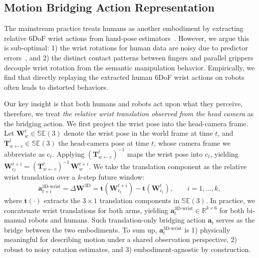\subsection{Motion Bridging Action Representation}
\label{sec:method:action_repr}


% 
The mainstream practice treats humans as another embodiment by extracting relative 6DoF wrist actions from hand-pose estimators~\cite{kareer2025egomimic,kareer2025emergence,cheang2025gr3,yuan2025motiontrans,zheng2026egoscale}.
% 
However, we argue this is sub-optimal: 1) the wrist rotations for human data are noisy due to predictor errors~\cite{wei2026one}, and 2) the distinct contact patterns between fingers and parallel grippers decouple wrist rotation from the semantic manipulation behavior. 
% 
Empirically, we find that directly replaying the extracted human 6DoF wrist actions on robots often leads to distorted behaviors.


%
Our key insight is that both humans and robots act upon what they perceive, therefore, we treat \emph{the relative wrist translation observed from the head camera} as the bridging action.
% 
We first project the wrist pose into the head-camera frame.
% 
Let $\mathbf{W}^{t}_{w}\!\in\!\mathbb{SE}(3)$ denote the wrist pose in the world frame at time $t$, and $\mathbf{T}^{t}_{w\leftarrow c}\!\in\!\mathbb{SE}(3)$ the head-camera pose at time $t$, whose camera frame we abbreviate as $\mathrm{c}_t$.
%
Applying $(\mathbf{T}^{t}_{w\leftarrow c})^{-1}$ maps the wrist pose into $\mathrm{c}_t$, yielding $\mathbf{W}^{t+i}_{\mathrm{c}_t} = (\mathbf{T}^{t}_{w\leftarrow c})^{-1}\,\mathbf{W}^{t+i}_{w}$. 
% 
We take the translation component as the relative wrist translation over a $k$-step future window:
%
\begin{equation}
\boldsymbol{a}^{\text{3D-wrist}}_{t+i}
= \Delta \mathbf{W}^{\text{3D}}
= \boldsymbol{t}\!\left( \mathbf{W}^{t+i}_{\mathrm{c}_t} \right)
- \boldsymbol{t}\!\left( \mathbf{W}_{\mathrm{c}_t}^{t} \right), \qquad i = 1, \dots, k,
\end{equation}
%
where $\boldsymbol{t}(\cdot)$ extracts the $3\!\times\!1$ translation components in $\mathbb{SE}(3)$. 
% 
In practice, we concatenate wrist translations for both arms, yielding $\mathbf{a}_{t}^{\text{3D-wrist}}\!\in\!\mathbb{R}^{k\times 6}$  for both bi-manual robots and humans.
% 
Such translation-only bridging action $\mathbf{a}_{t}$ serves as the bridge between the two embodiments.
% 
To sum up, $\mathbf{a}_{t}^{\text{3D-wrist}}$ is 1) physically meaningful for describing motion under a shared observation perspective, 2) robust to noisy rotation estimates, and 3) embodiment-agnostic by construction.




